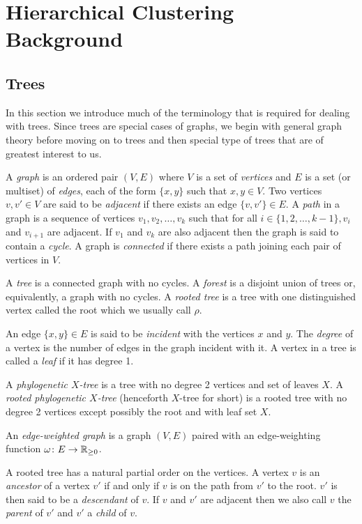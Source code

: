\chapter{Hierarchical Clustering Background}
\label{cha:background2}

\section{Trees}
\label{sec:trees}

In this section we introduce much of the terminology that is required for
dealing with trees.  Since trees are special cases of graphs, we begin with
general graph theory before moving on to trees and then special type of trees
that are of greatest interest to us.

A \textit{graph} is an ordered pair $(V,E)$ where $V$ is a set of
\textit{vertices} and $E$ is a set (or multiset) of \textit{edges}, each of
the form $\{x,y\}$ such that $x,y \in V$.  Two vertices $v,v' \in V$ are said
to be \textit{adjacent} if there exists an edge $\{v,v'\} \in E$.  A
\textit{path} in a graph is a sequence of vertices $v_1,v_2,\dotsc,v_k$ such
that for all $i \in \{1,2,\dotsc,k-1\}, v_i$ and $v_{i+1}$ are adjacent.  If
$v_1$ and $v_k$ are also adjacent then the graph is said to contain a
\textit{cycle}.  A graph is \textit{connected} if there exists a path joining
each pair of vertices in $V$.

A \textit{tree} is a connected graph with no cycles.  A \textit{forest} is a
disjoint union of trees or, equivalently, a graph with no cycles.  A
\textit{rooted tree} is a tree with one distinguished vertex called the root
which we usually call $\rho$.

An edge $\{x,y\} \in E$ is said to be \textit{incident} with the vertices $x$
and $y$.  The \textit{degree} of a vertex is the number of edges in the graph
incident with it.  A vertex in a tree is called a \textit{leaf} if it has
degree 1.

A \textit{phylogenetic $X$-tree} is a tree with no degree 2 vertices and set
of leaves $X$.  A \textit{rooted phylogenetic $X$-tree} (henceforth $X$-tree
for short) is a rooted tree with no degree 2 vertices except possibly the root
and with leaf set $X$.

An \textit{edge-weighted graph} is a graph $(V,E)$ paired with an
edge-weighting function $\omega \colon E \to {\mathbb R}_{\geq 0}$.

A rooted tree has a natural partial order on the vertices.  A vertex $v$ is an
\textit{ancestor} of a vertex $v'$ if and only if $v$ is on the path from $v'$
to the root.  $v'$ is then said to be a \textit{descendant} of $v$.  If $v$
and $v'$ are adjacent then we also call $v$ the \textit{parent} of $v'$ and
$v'$ a \textit{child} of $v$.


